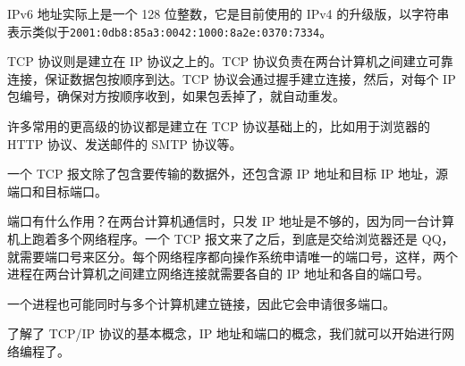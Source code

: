 IPv6 地址实际上是一个 128 位整数，它是目前使用的 IPv4
的升级版，以字符串表示类似于\texttt{2001:0db8:85a3:0042:1000:8a2e:0370:7334}。

TCP 协议则是建立在 IP 协议之上的。TCP
协议负责在两台计算机之间建立可靠连接，保证数据包按顺序到达。TCP
协议会通过握手建立连接，然后，对每个 IP
包编号，确保对方按顺序收到，如果包丢掉了，就自动重发。

许多常用的更高级的协议都是建立在 TCP 协议基础上的，比如用于浏览器的 HTTP
协议、发送邮件的 SMTP 协议等。

一个 TCP 报文除了包含要传输的数据外，还包含源 IP 地址和目标 IP
地址，源端口和目标端口。

端口有什么作用？在两台计算机通信时，只发 IP
地址是不够的，因为同一台计算机上跑着多个网络程序。一个 TCP
报文来了之后，到底是交给浏览器还是
QQ，就需要端口号来区分。每个网络程序都向操作系统申请唯一的端口号，这样，两个进程在两台计算机之间建立网络连接就需要各自的
IP 地址和各自的端口号。

一个进程也可能同时与多个计算机建立链接，因此它会申请很多端口。

了解了 TCP/IP 协议的基本概念，IP
地址和端口的概念，我们就可以开始进行网络编程了。

